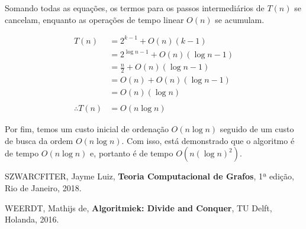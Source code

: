 \documentclass{homework}
\begin{document}
	Somando todas as equações, os termos para os passos intermediários de $T(n)$ se cancelam, enquanto as operações de tempo linear $O(n)$ se acumulam.\par
	
	\pagebreak
	
	\begin{align*}
		T\left(n\right) &= 2^{k-1} + O(n) (k - 1)\\
						&= 2^{\log n - 1} + O(n) (\log n - 1)\\
						&= \frac{n}{2} + O(n) (\log n - 1)\\
						&= O(n) + O(n) (\log n - 1)\\
						&= O(n) (\log n)\\
						~\\
		\therefore T\left(n\right)	&= O(n \log n)
	\end{align*}
	
	Por fim, temos um custo inicial de ordenação $O(n \log n)$ seguido de um custo de busca da ordem $O(n \log n)$. Com isso, está demonstrado que o algoritmo é de tempo $O(n \log n)$ e, portanto é de tempo $O(n (\log n)^2)$.
		
	\begin{thebibliography}{10}
		 SZWARCFITER, Jayme Luiz, \textbf{Teoria Computacional de Grafos}, 1ª edição, Rio de Janeiro, 2018.
		
		 WEERDT, Mathijs de, \textbf{Algoritmiek: Divide and Conquer}, TU Delft, Holanda, 2016.
	\end{thebibliography}
	
\end{document}
